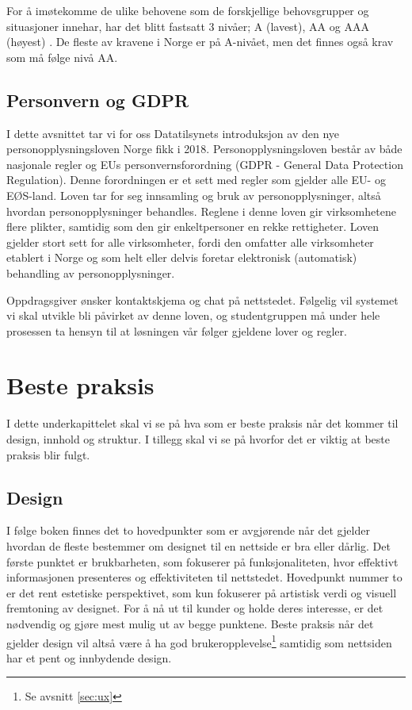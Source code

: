 For å imøtekomme de ulike behovene som de forskjellige behovsgrupper og situasjoner innehar, har det blitt fastsatt 3 nivåer; A (lavest), AA og AAA (høyest) \cite{w3c2008wca}. De fleste av kravene i Norge er på A-nivået, men det finnes også krav som må følge nivå AA.

\subsection{Personvern og GDPR}
I dette avsnittet tar vi for oss Datatilsynets \cite{data2018opm} introduksjon av den nye personopplysningsloven Norge fikk i 2018. Personopplysningsloven består av både nasjonale regler og EUs personvernsforordning (GDPR - General Data Protection Regulation). Denne forordningen er et sett med regler som gjelder alle EU- og EØS-land. Loven tar for seg innsamling og bruk av personopplysninger, altså hvordan personopplysninger behandles. Reglene i denne loven gir virksomhetene flere plikter, samtidig som den gir enkeltpersoner en rekke rettigheter. Loven gjelder stort sett for alle virksomheter, fordi den omfatter alle virksomheter etablert i Norge og som helt eller delvis foretar elektronisk (automatisk) behandling av personopplysninger. 

Oppdragsgiver ønsker kontaktskjema og chat på nettstedet. Følgelig vil systemet vi skal utvikle bli påvirket av denne loven, og studentgruppen må under hele prosessen ta hensyn til at løsningen vår følger gjeldene lover og regler.

\section{Beste praksis}

I dette underkapittelet skal vi se på hva som er beste praksis når det kommer til design, innhold og struktur. I tillegg skal vi se på hvorfor det er viktig at beste praksis blir fulgt.

\subsection{Design}
\label{sec:design}
I følge boken  \cite[s.~5]{beaird2014tpo} finnes det to hovedpunkter som er avgjørende når det gjelder hvordan de fleste bestemmer om designet til en nettside er bra eller dårlig. Det første punktet er brukbarheten, som fokuserer på funksjonaliteten, hvor effektivt informasjonen presenteres og effektiviteten til nettstedet. Hovedpunkt nummer to er det rent estetiske perspektivet, som kun fokuserer på artistisk verdi og visuell fremtoning av designet. For å nå ut til kunder og holde deres interesse, er det nødvendig og gjøre mest mulig ut av begge punktene. Beste praksis når det gjelder design vil altså være å ha god brukeropplevelse\footnote{Se avsnitt \ref{sec:ux}} samtidig som nettsiden har et pent og innbydende design.

